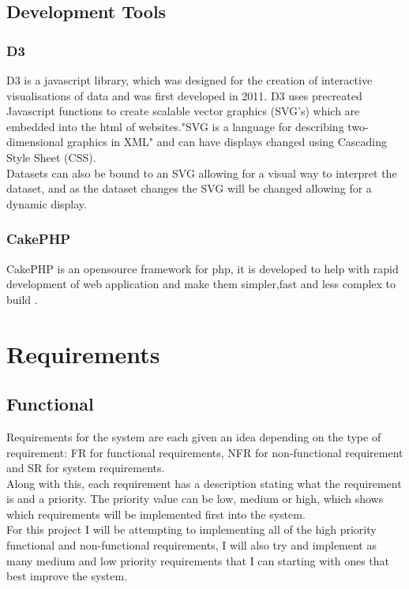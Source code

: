 \documentclass[12pt]{article}  %
\begin{document}
\subsection{Development Tools}
\subsubsection{D3}
D3 \cite{bostock_d3.js_????} is a javascript library, which was designed for the creation of interactive visualisations of data and was first developed in 2011. D3 uses precreated Javascript functions to create scalable vector graphics (SVG's) which are embedded into the html of websites."SVG is a language for describing two-dimensional graphics in XML"\cite{ferraiolo_scalable_2000} and can have displays changed  using Cascading Style Sheet (CSS).  \\
Datasets can also be bound to an SVG allowing for a visual way to interpret the dataset, and as the dataset changes the SVG will be changed allowing for a dynamic display. 


\subsubsection{CakePHP}
CakePHP is an opensource framework for php, it is developed to help with rapid development of web application and make them simpler,fast and less complex to build \cite{_cakephp_????}.
  





\newpage
\section{Requirements}
 


\subsection{Functional}
Requirements for the system are each given an idea depending on the type of requirement: FR for functional requirements, NFR for non-functional requirement and SR for system requirements.\\
Along with this, each requirement has a description stating what the requirement is and a priority. The priority value can be low, medium or high, which shows which requirements will be implemented first into the system.\\
For this project I will be attempting to implementing all of the high priority functional and non-functional requirements, I will also try and implement as many medium and low priority requirements that I can starting with ones that best improve the system. 
\end{document}
